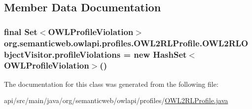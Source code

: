\subsection{Member Data Documentation}
\hypertarget{classorg_1_1semanticweb_1_1owlapi_1_1profiles_1_1_o_w_l2_r_l_profile_1_1_o_w_l2_r_l_object_visitor_af337593d4c47f15792c11838113d7927}{
\subsubsection[{profile\-Violations}]{\setlength{\rightskip}{0pt plus 5cm}final Set$<${\bf O\-W\-L\-Profile\-Violation}$>$ org.\-semanticweb.\-owlapi.\-profiles.\-O\-W\-L2\-R\-L\-Profile.\-O\-W\-L2\-R\-L\-Object\-Visitor.\-profile\-Violations = new Hash\-Set$<${\bf O\-W\-L\-Profile\-Violation}$>$()\hspace{0.3cm}{\ttfamily [private]}}}\label{classorg_1_1semanticweb_1_1owlapi_1_1profiles_1_1_o_w_l2_r_l_profile_1_1_o_w_l2_r_l_object_visitor_af337593d4c47f15792c11838113d7927}


The documentation for this class was generated from the following file\-:\begin{DoxyCompactItemize}
\item 
api/src/main/java/org/semanticweb/owlapi/profiles/\hyperlink{_o_w_l2_r_l_profile_8java}{O\-W\-L2\-R\-L\-Profile.\-java}\end{DoxyCompactItemize}
